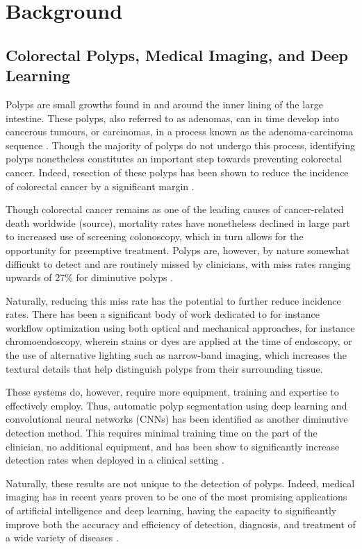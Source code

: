 \chapter{Background}
\setcounter{chapter}{2}


\section{Colorectal Polyps, Medical Imaging, and Deep Learning}
Polyps are small growths found in and around the inner lining of the large intestine. These polyps, also referred to as adenomas, can in time develop into cancerous tumours, or carcinomas, in a process known as the adenoma-carcinoma sequence \cite{ACS}. Though the majority of polyps do not undergo this process, identifying polyps nonetheless constitutes an important step towards preventing colorectal cancer. Indeed, resection of these polyps has been shown to reduce the incidence of colorectal cancer by a significant margin \cite{resection}.

Though colorectal cancer remains as one of the leading causes of cancer-related death worldwide (source), mortality rates have nonetheless declined in large part to increased use of screening colonoscopy, which in turn allows for the opportunity for preemptive treatment. Polyps are, however, by nature somewhat difficukt to detect and are routinely missed by clinicians, with miss rates ranging upwards of 27\% for diminutive polyps \cite{missrate1, missrate2}.

Naturally, reducing this miss rate has the potential to further reduce incidence rates. There has been a significant body of work dedicated to for instance workflow optimization using both optical and mechanical approaches, for instance chromoendoscopy, wherein stains or dyes are applied at the time of endoscopy, or the use of alternative lighting such as narrow-band imaging, which increases the textural details that help distinguish polyps from their surrounding tissue.

These systems do, however, require more equipment, training and expertise to effectively employ. Thus, automatic polyp segmentation using deep learning and convolutional neural networks (CNNs) has been identified as another diminutive detection method. This requires minimal training time on the part of the clinician, no additional equipment, and has been show to significantly increase detection rates when deployed in a clinical setting \cite{polyp-success-story}.

Naturally, these results are not unique to the detection of polyps. Indeed, medical imaging has in recent years proven to be one of the most promising applications of artificial intelligence and deep learning, having the capacity to significantly improve both the accuracy and efficiency of detection, diagnosis, and treatment of a wide variety of diseases \cite{dl_medical_imaging}.

